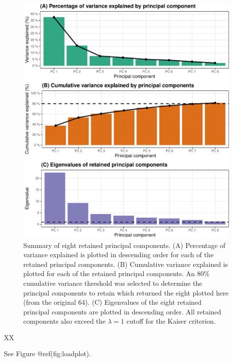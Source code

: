 \documentclass{article}
\begin{document}
\begin{figure}
\centering
\includegraphics{olet5610_report_files/figure-latex/eigenplots-1.pdf}
\caption{Summary of eight retained principal components. (A) Percentage
of variance explained is plotted in descending order for each of the
retained principal components. (B) Cumulative variance explained is
plotted for each of the retained principal components. An 80\%
cumulative variance threshold was selected to determine the principal
components to retain which returned the eight plotted here (from the
original 64). (C) Eigenvalues of the eight retained principal components
are plotted in descending order. All retained components also exceed the
\(\lambda = 1\) cutoff for the Kaiser criterion.}
\end{figure}

XX

See Figure @ref(fig:loadplot).
\end{document}

